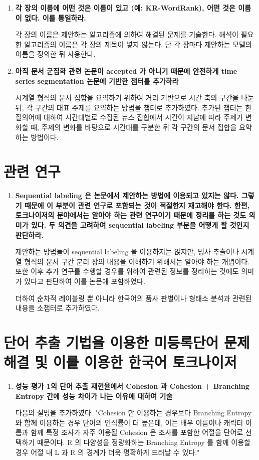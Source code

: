\documentclass[11pt]{article}
\begin{document}
\begin{enumerate}
\item \textbf{각 장의 이름에 어떤 것은 이름이 있고 (예: KR-WordRank), 어떤 것은 이름이 없다. 이를 통일하라.}

각 장의 이름은 제안하는 알고리즘에 의하여 해결된 문제를 기술한다. 해석이 필요한 알고리즘의 이름은 각 장의 제목이 넣지 않는다. 단 각 장마다 제안하는 모델의 이름을 정의한 뒤 사용한다.

\item \textbf{아직 문서 군집화 관련 논문이 accepted 가 아니기 때문에 안전하게 time series segmentation 논문에 기반한 챕터를 추가하라}

시계열 형식의 문서 집합을 요약하기 위하여 거리 기반으로 시간 축의 구간을 나눈 뒤, 각 구간의 대표 주제를 요약하는 방법을 챕터로 추가하였다.
추가된 챕터는 한 질의어에 대하여 시간대별로 수집된 뉴스 집합에서 시간이 지남에 따라 주제가 변화할 때, 주제의 변화를 바탕으로 시간대를 구분한 뒤 각 구간의 문서 집합을 요약하는 방법이다.

\end{enumerate}


\section{관련 연구}
\begin{enumerate}
\item \textbf{Sequential labeling 은 논문에서 제안하는 방법에 이용되고 있지는 않다. 그렇기 때문에 이 부분이 관련 연구로 포함되는 것이 적절한지 재고해야 한다. 한편, 토크나이저의 분야에서는 알아야 하는 관련 연구이기 때문에 정리를 하는 것도 의미가 있다. 두 의견을 고려하여 sequential labeling 부분을 어떻게 할 것인지 판단하라.}

제안하는 방법들이 sequential labeling 을 이용하지는 않지만, 명사 추출이나 시계열 형식의 문서 구간 분리 장의 내용을 이해하기 위해서는 알아야 하는 개념이다.
또한 이후 추가 연구를 수행할 경우를 위하여 관련된 정보를 정리하는 것에도 의미가 있다고 판단하여 이를 논문에 포함하였다.

더하여 순차적 레이블링 뿐 아니라 한국어의 품사 판별이나 형태소 분석과 관련된 내용을 소챕터로 추가하였다.

\end{enumerate}


\section{단어 추출 기법을 이용한 미등록단어 문제 해결
및 이를 이용한 한국어 토크나이저}
\begin{enumerate}
\item \textbf{성능 평가 1의 단어 추출 재현율에서 Cohesion 과 Cohesion + Branching Entropy 간에 성능 차이가 나는 이유에 대하여 기술}

다음의 설명을 추가하였다.
"Cohesion 만 이용하는 경우보다 Branching Entropy 와 함께 이용하는 경우 단어의 인식률이 더 높은데, 이는 배우 이름이나 캐릭터 이름과 함께 특정 조사가 자주 이용될 Cohesion 은 조사를 포함한 어절을 단어로 선택하기 때문이다.
R 의 다양성을 정량화하는 Branching Entropy 를 함께 이용할 경우 어절 내 L 과 R 의 경계가 더욱 명확하게 드러날 수 있다."

\end{enumerate}
\end{document}
